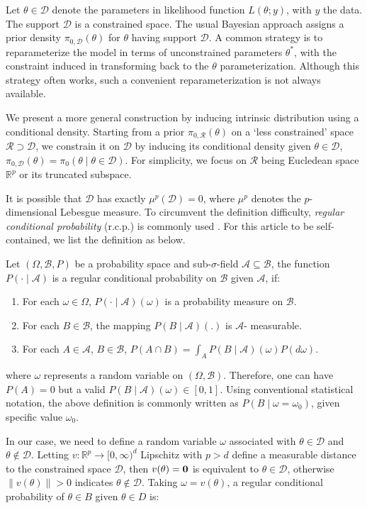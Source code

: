 \documentclass[10pt]{article}
\newcommand{\bb}[1]{\mathbb{#1}}
\newcommand{\mc}[1]{\mathcal{#1}}
\DeclareMathOperator{\1}{\mathbbm{1}}
\begin{document}
Let $\theta \in \mc D$ denote the parameters in likelihood function $L(\theta;y)$, with $y$ the data. The support $\mc D$ is a constrained space. The usual Bayesian approach assigns a prior density $\pi_{0,\mc D}(\theta)$ for $\theta$ having support $\mc D$.  A common strategy is to reparameterize the model in terms of unconstrained parameters $\theta^*$, with the constraint induced in transforming back to the $\theta$ parameterization.  Although this strategy often works, such a convenient reparameterization is not always available.  

We present a more general construction by inducing intrinsic distribution using a conditional density. Starting from a prior $\pi_{0,\mc R}(\theta)$ on a `less constrained' space $\mc R\supset \mc D$, we constrain it on $\mc D$ by inducing its conditional density given $\theta\in \mc D$, $\pi_{0,\mc D}(\theta)=\pi_{0}(\theta\mid \theta\in\mc D)$. For simplicity, we focus on $\mc R$ being Eucledean space $\mathbb{R}^{p}$ or its truncated subspace. 

It is possible that $\mc D$ has exactly $\mu^{p}(\mc D)=0$, where $\mu^{p}$ denotes the $p$-dimensional Lebesgue measure. To circumvent the definition difficulty, {\it regular conditional probability} (r.c.p.) is commonly used \citep{kolmogorov1950foundations}. For this article to be self-contained, we list the definition as below.

Let $(\Omega, \mathscr B, P)$ be a probability space and sub-$\sigma$-field $\mathscr A\subseteq \mathscr B$, the function $P(\cdot\mid \mathscr A)$ is a regular conditional probability on $\mathscr B$ given $\mathscr A$, if:
\begin{enumerate}
	\item For each $\omega\in  \Omega$, $P(\cdot\mid \mathscr A)(\omega)$ is a probability measure on $\mathscr B$.
	\item For each $B\in \mathscr B$, the mapping $P(B\mid \mathscr A)(.)$ is $\mathscr A$- measurable.
	\item For each $A \in \mathscr A$, $B\in \mathscr B$, $P(A\cap B)=\int_{A} P(B\mid \mathscr A)(\omega)P(d\omega)$.
\end{enumerate}
where $\omega$ represents a random variable on $(\Omega, \mathscr B)$.  Therefore, one can have $P(A)=0$ but a valid $P(B\mid \mathscr A)(\omega)\in [0,1]$. Using conventional statistical notation, the above definition is commonly written as $P(B\mid \omega = \omega_0)$, given specific value $\omega_0$.

In our case, we need to define a random variable $\omega$ associated with $\theta\in \mc D$ and $\theta \not\in \mc D$. Letting  $v: \bb{R}^p\rightarrow \bb [0,\infty)^d$ Lipschitz with $p>d$ define a measurable distance to the constrained space $\mc D$, then $v(\theta)=\bf 0$ is equivalent to $\theta\in \mc D$, otherwise $\| v(\theta)\|>0$ indicates $\theta\not\in \mc D$. Taking $\omega= v(\theta)$, a regular conditional probability of $\theta\in B$ given $\theta\in D$ is:
\end{document}

